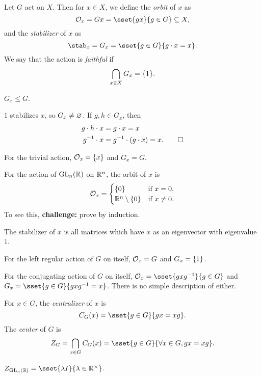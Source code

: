 \begin{definition*} \label{def:orbit}
    Let $G$ act on $X$.
    Then for $x \in X$, we define the \emph{orbit} of $x$ as \[
        \mcO_x = G x = \sset{g x}{g \in G} \subseteq X,
    \] and the \emph{stabilizer} of $x$ as \[
        \stab_x = G_x = \sset{g \in G}{g \cdot x = x}.
    \] We say that the action is \emph{faithful} if \[
        \bigcap_{x \in X} G_x = \{1\}.
    \]
\end{definition*}
\begin{exercise}
    $G_x \le G$.
\end{exercise}
\begin{solution}
    $1$ stabilizes $x$, so $G_x \ne \varnothing$.
    If $g, h \in G_x$, then \begin{align*}
        g \cdot h \cdot x &= g \cdot x = x \\
        g^{-1} \cdot x &= g^{-1} \cdot (g \cdot x) = x. \qedhere
    \end{align*}
\end{solution}
\begin{examples}
    \item For the trivial action, $\mathcal{O}_x = \{x\}$ and $G_x = G$.
    \item For the action of $\operatorname{GL}_n(\mathbb{R})$ on $\mathbb{R}^n$, the orbit of $x$ is \[
        \mathcal{O}_x = \begin{cases}
            \{0\} & \text{if } x = 0, \\
            \mathbb{R}^n \setminus \{0\} & \text{if } x \ne 0.
        \end{cases}
    \] To see this, \textbf{challenge:} prove by induction.

    The stabilizer of $x$ is all matrices which have $x$ as an eigenvector
    with eigenvalue $1$.
    \item For the left regular action of $G$ on itself,
        $\mathcal{O}_x = G$ and $G_x = \{1\}$.
    \item For the conjugating action of $G$ on itself,
        $\mcO_x = \sset{gxg^{-1}}{g \in G}$ and
        $G_x = \sset{g \in G}{gxg^{-1} = x}$.
        There is no simple description of either.
\end{examples}

\begin{definition*} \label{def:center}
    For $x \in G$, the \emph{centralizer} of $x$ is \[
        C_G(x) = \sset{g \in G}{gx = xg}.
    \] The \emph{center} of $G$ is \[
        Z_G = \bigcap_{x \in G} C_G(x)
            = \sset{g \in G}{\forall x \in G, gx = xg}.
    \]
\end{definition*}
\begin{example}
    $Z_{\GL_n(\R)} = \sset{\lambda I}{\lambda \in \R^\times}$.
\end{example}

